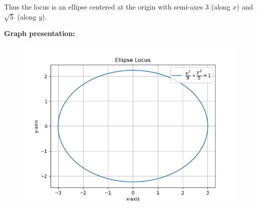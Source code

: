 \documentclass[journal]{IEEEtran}
\begin{document}
Thus the locus is an ellipse centered at the origin with semi-axes $3$ (along $x$) and $\sqrt{5}$ (along $y$).

\textbf{Graph presentation:}
\begin{figure}[H]
\begin{center}
\includegraphics[width=0.6\columnwidth]{figs/fig9.png}
\end{center}
\caption{}
\label{fig:Fig}
\end{figure}
\end{document}
